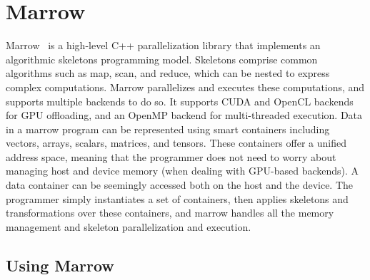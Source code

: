 

\section{Marrow}
\label{sec:marrow}

Marrow~\cite{paper:marrow, paper:marrowcompound, paper:marrowparallel} is a high-level C++ parallelization library that implements an algorithmic skeletons programming model. Skeletons comprise common algorithms such as map, scan, and reduce, which can be nested to express complex computations. Marrow parallelizes and executes these computations, and supports multiple backends to do so. It supports \gls{CUDA} and OpenCL backends for \gls{GPU} offloading, and an OpenMP backend for multi-threaded execution. Data in a marrow program can be represented using smart containers including vectors, arrays, scalars, matrices, and tensors. These containers offer a unified address space, meaning that the programmer does not need to worry about managing host and device memory (when dealing with \gls{GPU}-based backends). A data container can be seemingly accessed both on the host and the device. The programmer simply instantiates a set of containers, then applies skeletons and transformations over these containers, and marrow handles all the memory management and skeleton parallelization and execution.

\subsection{Using Marrow}


